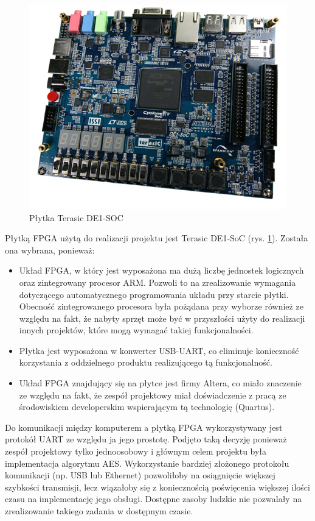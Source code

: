 \begin{figure}[!h]
\centering
\includegraphics[width=\textwidth]{pictures/fpga-board.jpg}
\caption{Płytka Terasic DE1-SOC \cite{plytka}}
\label{fig:fpga-board}
\end{figure}

Płytką FPGA użytą do realizacji projektu jest Terasic DE1-SoC (rys. \ref{fig:fpga-board}). Została ona wybrana, ponieważ:
\begin{itemize}
\item Układ FPGA, w który jest wyposażona ma dużą liczbę jednostek logicznych oraz zintegrowany procesor ARM. Pozwoli to na zrealizowanie wymagania dotyczącego automatycznego programowania układu przy starcie płytki. Obecność zintegrowanego procesora była pożądana przy wyborze również ze względu na fakt, że nabyty sprzęt może być w przyszłości użyty do realizacji innych projektów, które mogą wymagać takiej funkcjonalności.
\item Płytka jest wyposażona w konwerter USB-UART, co eliminuje konieczność korzystania z oddzielnego produktu realizującego tą funkcjonalność.
\item Układ FPGA znajdujący się na płytce jest firmy Altera, co miało znaczenie ze względu na fakt, że zespół projektowy miał doświadczenie z pracą ze środowiskiem developerskim wspierającym tą technologię (Quartus).
\end{itemize}

Do komunikacji między komputerem a płytką FPGA wykorzystywany jest protokół UART ze względu ja jego prostotę. Podjęto taką decyzję ponieważ zespół projektowy tylko jednoosobowy i głównym celem projektu była implementacja algorytmu AES. Wykorzystanie bardziej złożonego protokołu komunikacji (np. USB lub Ethernet) pozwoliłoby na osiągnięcie większej szybkości transmisji, lecz wiązałoby się z koniecznością poświęcenia większej ilości czasu na implementację jego obsługi. Dostępne zasoby ludzkie nie pozwalały na zrealizowanie takiego zadania w dostępnym czasie.

